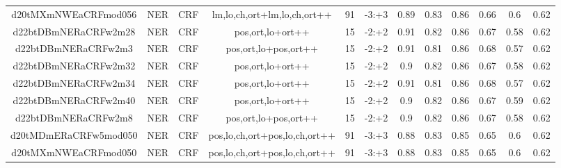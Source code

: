 \documentclass[a4paper]{article}
\begin{document}
\begin{landscape}
\begin{center}
\begin{tabular}{ |c|c|c|c|c|c|c|c|c|c|c|c|}
 	
 
 	
 		
 		\small{ d20tMXmNWEaCRFmod056 } & NER & CRF & lm,lo,ch,ort+lm,lo,ch,ort++  &  91 &  -3:+3  &  0.89 & 0.83 & 0.86  &  0.66 & 0.6 & 0.62 \\
 		

 	
 
 	
 		
 		\small{ d22btDBmNERaCRFw2m28 } & NER & CRF & pos,ort,lo+ort++  &  15 &  -2:+2  &  0.91 & 0.82 & 0.86  &  0.67 & 0.58 & 0.62 \\
 		

 	
 
 	
 		
 		\small{ d22btDBmNERaCRFw2m3 } & NER & CRF & pos,ort,lo+pos,ort++  &  15 &  -2:+2  &  0.91 & 0.81 & 0.86  &  0.68 & 0.57 & 0.62 \\
 		

 	
 
 	
 		
 		\small{ d22btDBmNERaCRFw2m32 } & NER & CRF & pos,ort,lo+ort++  &  15 &  -2:+2  &  0.9 & 0.82 & 0.86  &  0.67 & 0.58 & 0.62 \\
 		

 	
 
 	
 		
 		\small{ d22btDBmNERaCRFw2m34 } & NER & CRF & pos,ort,lo+ort++  &  15 &  -2:+2  &  0.91 & 0.81 & 0.86  &  0.68 & 0.57 & 0.62 \\
 		

 	
 
 	
 		
 		\small{ d22btDBmNERaCRFw2m40 } & NER & CRF & pos,ort,lo+ort++  &  15 &  -2:+2  &  0.9 & 0.82 & 0.86  &  0.67 & 0.59 & 0.62 \\
 		

 	
 
 	
 		
 		\small{ d22btDBmNERaCRFw2m8 } & NER & CRF & pos,ort,lo+pos,ort++  &  15 &  -2:+2  &  0.9 & 0.82 & 0.86  &  0.67 & 0.58 & 0.62 \\
 		

 	
 
 	
 		
 		\small{ d20tMDmERaCRFw5mod050 } & NER & CRF & pos,lo,ch,ort+pos,lo,ch,ort++  &  91 &  -3:+3  &  0.88 & 0.83 & 0.85  &  0.65 & 0.6 & 0.62 \\
 		

 	
 
 	
 		
 		\small{ d20tMXmNWEaCRFmod050 } & NER & CRF & pos,lo,ch,ort+pos,lo,ch,ort++  &  91 &  -3:+3  &  0.88 & 0.83 & 0.85  &  0.65 & 0.6 & 0.62 \\
 		


\end{tabular}
\end{center}
\end{landscape}
\end{document}

